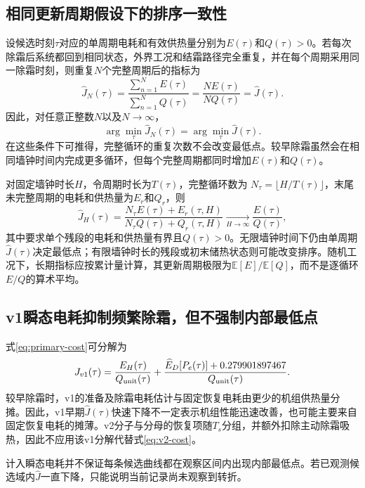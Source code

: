 \documentclass[UTF8,11pt,a4paper]{ctexart}
\begin{document}
\subsection{相同更新周期假设下的排序一致性}
设候选时刻$\tau$对应的单周期电耗和有效供热量分别为$E(\tau)$和$Q(\tau)>0$。若每次除霜后系统都回到相同状态，外界工况和结霜路径完全重复，并在每个周期采用同一除霜时刻，则重复$N$个完整周期后的指标为
\begin{equation}
\widehat J_N(\tau)=\frac{\sum_{n=1}^{N}E(\tau)}{\sum_{n=1}^{N}Q(\tau)}
=\frac{NE(\tau)}{NQ(\tau)}=\widehat J(\tau).
\end{equation}
因此，对任意正整数$N$以及$N\rightarrow\infty$，
\begin{equation}
\arg\min_\tau \widehat J_N(\tau)=\arg\min_\tau \widehat J(\tau).
\end{equation}
在这些条件下可推得，完整循环的重复次数不会改变最低点。较早除霜虽然会在相同墙钟时间内完成更多循环，但每个完整周期都同时增加$E(\tau)$和$Q(\tau)$。

对固定墙钟时长$H$，令周期时长为$T(\tau)$，完整循环数为
$N_\tau=\lfloor H/T(\tau)\rfloor$，末尾未完整周期的电耗和供热量为$E_r$和$Q_r$，则
\begin{equation}
\widehat J_H(\tau)=\frac{N_\tau E(\tau)+E_r(\tau,H)}
{N_\tau Q(\tau)+Q_r(\tau,H)}
\xrightarrow[H\to\infty]{}\frac{E(\tau)}{Q(\tau)},
\end{equation}
其中要求单个残段的电耗和供热量有界且$Q(\tau)>0$。无限墙钟时间下仍由单周期$\widehat J(\tau)$决定最低点；有限墙钟时长的残段或初末储热状态则可能改变排序。随机工况下，长期指标应按累计量计算，其更新周期极限为$\mathbb E[E]/\mathbb E[Q]$，而不是逐循环$E/Q$的算术平均。

\subsection{v1瞬态电耗抑制频繁除霜，但不强制内部最低点}
式\eqref{eq:primary-cost}可分解为
\begin{equation}
J_{v1}(\tau)=\frac{E_H(\tau)}{Q_{\rm unit}(\tau)}+
\frac{\widehat E_D[P_e(\tau)]+0.279901897467}{Q_{\rm unit}(\tau)}.
\end{equation}
较早除霜时，v1的准备及除霜电耗估计与固定恢复电耗由更少的机组供热量分摊。因此，v1早期$\widehat J(\tau)$快速下降不一定表示机组性能迅速改善，也可能主要来自固定恢复电耗的摊薄。v2分子与分母的恢复项随$T_s$分组，并额外扣除主动除霜吸热，因此不应用该v1分解代替式\eqref{eq:v2-cost}。

计入瞬态电耗并不保证每条候选曲线都在观察区间内出现内部最低点。若已观测候选域内$\widehat J$一直下降，只能说明当前记录尚未观察到转折。
\end{document}
